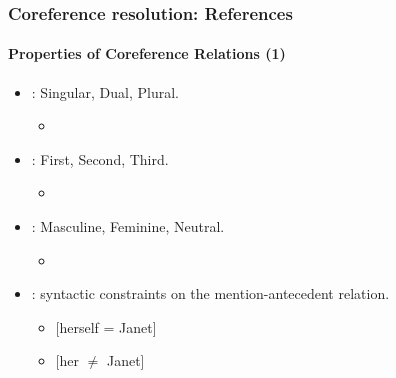 \documentclass[xcolor=table]{beamer}
\begin{document}
\begin{frame}
	\frametitle{Coreference resolution: References}
	\framesubtitle{Properties of Coreference Relations (1)}
	
	
	\begin{itemize}
		\item {}: Singular, Dual, Plural.
		\begin{itemize}
			\item {}
		\end{itemize}
	
		\item {}: First, Second, Third.
		\begin{itemize}
			\item {}
		\end{itemize}
		
		\item {}: Masculine, Feminine, Neutral.
		\begin{itemize}
			\item {}
		\end{itemize}
		
		\item {}: syntactic constraints on the mention-antecedent relation.
		\begin{itemize}
			\item {} [herself = Janet]
			\item {} [her $\ne$ Janet]
		\end{itemize}
	
	\end{itemize}
	
\end{frame}
\end{document}
